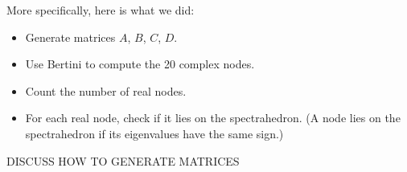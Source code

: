 \documentclass[12pt]{amsart}
\theoremstyle{plain}
\theoremstyle{definition}
\begin{document}
More specifically, here is what we did:
\begin{itemize}
	\item Generate matrices $A$, $B$, $C$, $D$.
	\item Use Bertini to compute the 20 complex nodes.
	\item Count the number of real nodes.
	\item For each real node, check if it lies on the spectrahedron. (A node
		lies on the spectrahedron if its eigenvalues have the same sign.)
\end{itemize}

DISCUSS HOW TO GENERATE MATRICES

\end{document}
